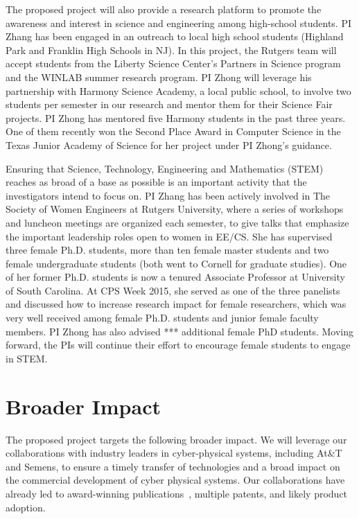 The proposed project will also provide a research platform to promote the awareness and interest in science and engineering among high-school students.  PI  Zhang has been engaged in an outreach to local high school students (Highland Park and Franklin High Schools in NJ). In this project, the Rutgers team will accept students from the Liberty Science Center's Partners in Science program and the WINLAB summer research program. PI Zhong will leverage his partnership with Harmony Science Academy, a local public school, to involve two students per semester in our research and mentor them for their Science Fair projects. PI Zhong has mentored five Harmony students in the past three years. One of them recently won the Second Place Award in Computer Science in the Texas Junior Academy of Science for her project under PI Zhong's guidance.


Ensuring that Science, Technology, Engineering and Mathematics (STEM) reaches as broad of a base as possible is an important activity that the investigators intend to focus on. PI Zhang has been actively involved in The Society of Women Engineers at Rutgers
University, where a series of workshops and luncheon meetings are
organized each semester, to give talks that emphasize the important
leadership roles open to women in EE/CS. She has supervised three female Ph.D. students, more than ten female master students and two female undergraduate students (both went to Cornell for graduate studies). One of her former Ph.D. students is now a tenured Associate Professor at University of South Carolina.
At CPS Week 2015, she served as one of the three panelists and discussed how to increase research impact for female researchers, which was very well received among female Ph.D. students and junior female faculty members. PI Zhong has also advised *** additional female PhD students. Moving forward, the PIs will continue their effort to encourage female students to engage in STEM.

\section{Broader Impact\label{sec:broader}}

The proposed project targets the following broader impact. We will leverage our collaborations with industry leaders in cyber-physical systems, including At\&T and Semens, to ensure a timely transfer of technologies and a broad impact on the commercial development of cyber physical systems. Our collaborations have already led to award-winning publications~\cite{liu2009percom,likamwa2011phonesense}, multiple patents, and likely product adoption.

